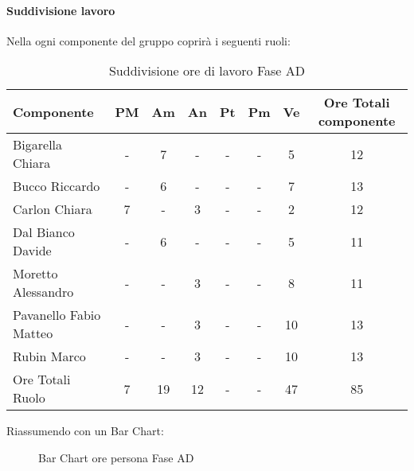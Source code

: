 			\paragraph{Suddivisione lavoro}
				Nella  ogni componente del gruppo \groupname{} coprirà i seguenti ruoli:
				\begin{table}
					\begin{center}
						\begin{tabular}{| l | c | c | c | c | c | c | c |}
							\hline
							Componente 					& PM		& Am 		& An 		& Pt 		& Pm 		& Ve 		& Ore Totali componente \\ \hline
							
							Bigarella Chiara 			& - 		& 7 		& - 		& - 		& - 		& 5 		& 12 \\
							Bucco Riccardo 				& - 		& 6 		& - 		& - 		& -			& 7 		& 13 \\
							Carlon Chiara	 			& 7 		& - 		& 3 		& - 		& - 		& 2 		& 12 \\
							Dal Bianco Davide 			& - 		& 6 		& - 		& - 		& - 		& 5 		& 11 \\
							Moretto Alessandro 			& - 		& - 		& 3 		& - 		& - 		& 8 		& 11 \\
							Pavanello Fabio Matteo	 	& - 		& - 		& 3 		& - 		& - 		& 10 		& 13 \\
							Rubin Marco					& - 		& - 		& 3 		& - 		& - 		& 10 		& 13 \\ \hline \hline
							
							Ore Totali Ruolo 			& 7 		& 19 		& 12 		& - 		& - 		& 47 		& 85\\ \hline
						\end{tabular}
					\end{center}
					\caption{Suddivisione ore di lavoro Fase AD}
				\end{table}
				Riassumendo con un Bar Chart:
				\begin{figure}\centering
					\caption{Bar Chart ore persona Fase AD}
				\end{figure}
